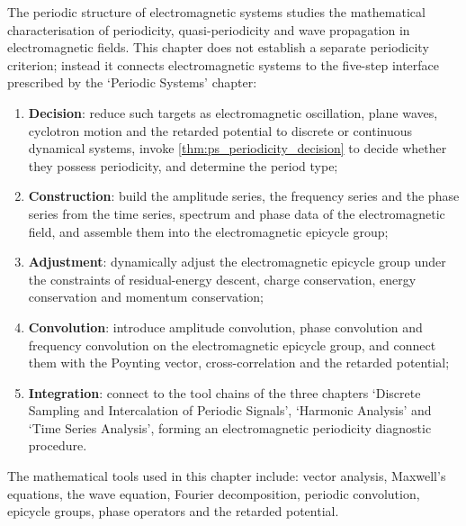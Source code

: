 \begin{remark}\label{rem:em_five_steps_positioning}
The periodic structure of electromagnetic systems studies the mathematical characterisation of periodicity, quasi-periodicity and wave propagation in electromagnetic fields. This chapter does not establish a separate periodicity criterion; instead it connects electromagnetic systems to the five-step interface prescribed by the `Periodic Systems' chapter:
\begin{enumerate}[label=(\arabic*)]
    \item \textbf{Decision}: reduce such targets as electromagnetic oscillation, plane waves, cyclotron motion and the retarded potential to discrete or continuous dynamical systems, invoke \cref{thm:ps_periodicity_decision} to decide whether they possess periodicity, and determine the period type;
    \item \textbf{Construction}: build the amplitude series, the frequency series and the phase series from the time series, spectrum and phase data of the electromagnetic field, and assemble them into the electromagnetic epicycle group;
    \item \textbf{Adjustment}: dynamically adjust the electromagnetic epicycle group under the constraints of residual-energy descent, charge conservation, energy conservation and momentum conservation;
    \item \textbf{Convolution}: introduce amplitude convolution, phase convolution and frequency convolution on the electromagnetic epicycle group, and connect them with the Poynting vector, cross-correlation and the retarded potential;
    \item \textbf{Integration}: connect to the tool chains of the three chapters `Discrete Sampling and Intercalation of Periodic Signals', `Harmonic Analysis' and `Time Series Analysis', forming an electromagnetic periodicity diagnostic procedure.
\end{enumerate}
The mathematical tools used in this chapter include: vector analysis, Maxwell's equations, the wave equation, Fourier decomposition, periodic convolution, epicycle groups, phase operators and the retarded potential.
\end{remark}

